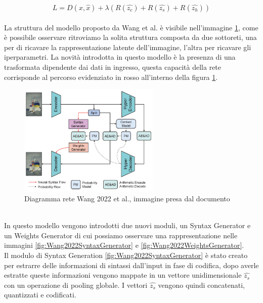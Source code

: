 \begin{equation}\label{eq:wang2022Loss}
    L = D(x,\hat{x}) + \lambda (R(\hat{z_{c}}) +  R(\hat{z_{s}}) + R(\hat{z_{h}}))
\end{equation}\\
La struttura del modello proposto da Wang et al. è visibile nell’immagine \ref{fig:Wang2022Network}, come è possibile osservare ritroviamo la solita struttura composta da due sottoreti, una per di ricavare la rappresentazione latente dell’immagine, l’altra per ricavare gli iperparametri. La novità introdotta in questo modello è la presenza di una trasformata dipendente dai dati in ingresso, questa capacità della rete corrisponde al percorso evidenziato in rosso all’interno della figura \ref{fig:Wang2022Network}.\\
\begin{figure}[!h]
    \centering
    \includegraphics[width=0.6\textwidth]{Immagini/Wang2022_Rete.png}
    \caption{Diagramma rete Wang 2022 et al., immagine presa dal documento \cite{wang2022neural}}
    \label{fig:Wang2022Network}
\end{figure}\\
In questo modello vengono introdotti due nuovi moduli, un Syntax Generator e un Weights Generator di cui possiamo osservare una rappresentazione nelle immagini \ref{fig:Wang2022SyntaxGenerator} e \ref{fig:Wang2022WeightsGenerator}.\\
Il modulo di Syntax Generation \ref{fig:Wang2022SyntaxGenerator} è stato creato per estrarre delle informazioni di sintassi dall’input in fase di codifica, dopo averle estratte queste informazioni vengono mappate in un vettore unidimensionale $\hat{z_{s}}$ con un operazione di pooling globale. I vettori $\hat{z_{s}}$ vengono quindi concatenati, quantizzati e codificati.\\

